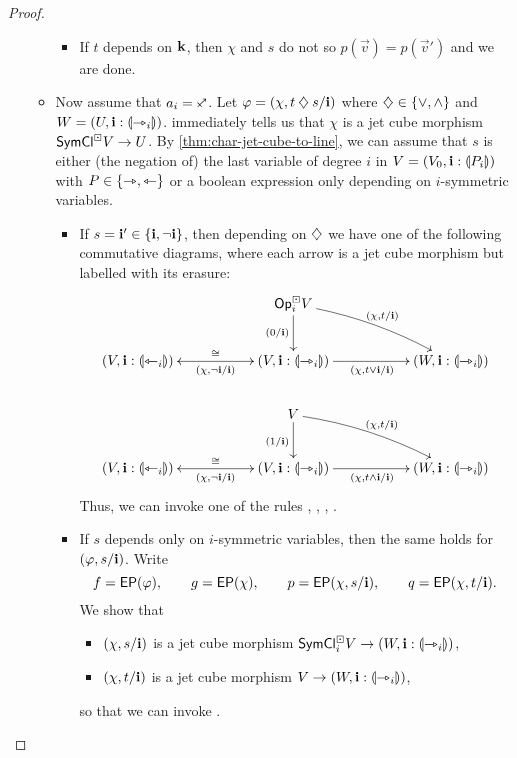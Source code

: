 \documentclass[a4paper]{memoir}
\begin{document}
\begin{proof}
\begin{itemize}
\begin{itemize}
\begin{itemize}
				\item If $t$ depends on $\mathbf{k}$, then $\chi$ and $s$ do not so $p(\vec v) = p(\vec v')$ and we are done.
			\end{itemize}
			
			\item Now assume that $a_i = \ypolar$.
			Let $\varphi = (\chi, t \mathbin{\diamondsuit} s/\mathbf{i})$ where $\mathbin{\diamondsuit} \in \mathopen{}\left\{ {\vee}, {\wedge} \right\}\mathclose{}$ and $W = (U, \mathbf{i} : {\llparenthesis \rightarrowtriangle_i \rrparenthesis})$.
			 immediately tells us that $\chi$ is a jet cube morphism $\mathsf{SymCl}^\boxdot V \to U$.
			By \cref{thm:char-jet-cube-to-line}, we can assume that $s$ is either (the negation of) the last variable of degree $i$ in $V = (V_0, \mathbf{i} : {\llparenthesis P_i \rrparenthesis})$ with $P \in \mathopen{}\left\{ \rightarrowtriangle, \leftarrowtriangle \right\}\mathclose{}$ or a boolean expression only depending on $i$-symmetric variables.
			\begin{itemize}
				\item If $s = \mathbf{i}' \in \mathopen{}\left\{ \mathbf{i}, \lnot \mathbf{i} \right\}\mathclose{}$, then depending on $\mathbin{\diamondsuit}$ we have one of the following commutative diagrams, where each arrow is a jet cube morphism but labelled with its erasure:
				\[
					\xymatrix{
						&&\Opcube_i V
							\ar[d]_{(0/\dm i)}
							\ar@/^/[rrd]^{(\chi, t/\dm i)}
						\\
						(V, \dm i : \rival{\tej_i})
							\ar@{<->}[rr]^{\cong}_{(\chi, \lnot \dm i/\dm i)}
						&&
						(V, \dm i : \rival{\jet_i})
							\ar[rr]_{(\chi, t \vee \dm i/\dm i)}
						&&
						(W, \dm i : \rival{\jet_i})
						\\
						&& V
							\ar[d]_{(1/\dm i)}
							\ar@/^/[rrd]^{(\chi, t/\dm i)}
						\\
						(V, \dm i : \rival{\tej_i})
							\ar@{<->}[rr]^{\cong}_{(\chi, \lnot \dm i/\dm i)}
						&&
						(V, \dm i : \rival{\jet_i})
							\ar[rr]_{(\chi, t \wedge \dm i/\dm i)}
						&&
						(W, \dm i : \rival{\jet_i})
					}
				\]
				Thus, we can invoke one of the rules , \allowbreak {}, , .
				
				\item If $s$ depends only on $i$-symmetric variables, then the same holds for $(\varphi, s / \mathbf{i})$. Write
				\[
					f = \mathsf{EP}(\varphi), \qquad
					g = \mathsf{EP}(\chi), \qquad
					p = \mathsf{EP}(\chi, s/\mathbf{i}), \qquad
					q = \mathsf{EP}(\chi, t/\mathbf{i}).
				\]
				We show that
				\begin{itemize}
					\item $(\chi, s / \mathbf{i})$ is a jet cube morphism $\mathsf{SymCl}^\boxdot_i V \to (W, \mathbf{i} : {\llparenthesis \rightarrowtriangle_i \rrparenthesis})$,
					\item $(\chi, t / \mathbf{i})$ is a jet cube morphism $V \to (W, \mathbf{i} : {\llparenthesis \rightarrowtriangle_i \rrparenthesis})$,
				\end{itemize}
				so that we can invoke .
				

\end{itemize}
\end{itemize}
\end{itemize}
\end{proof}
\end{document}
